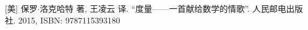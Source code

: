 \documentclass[UTF8]{article}
\begin{document}
\begin{Exercise}
\end{Exercise}

\ifx\wholebook\relax \else
\begin{thebibliography}{99}

[美] 保罗$\cdot$洛克哈特 著, 王凌云 译. ``度量——一首献给数学的情歌''. 人民邮电出版社. 2015, ISBN: 9787115393180

\end{thebibliography}

\expandafter\enddocument

\fi
\end{document}
